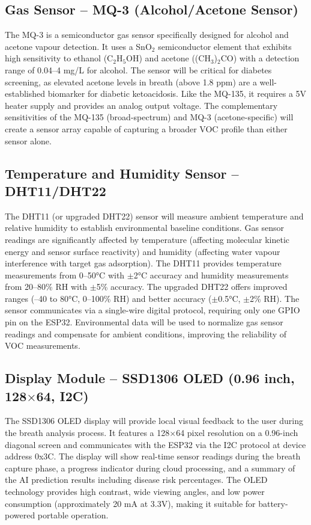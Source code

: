 \subsection{Gas Sensor -- MQ-3 (Alcohol/Acetone Sensor)}
The MQ-3 is a semiconductor gas sensor specifically designed for alcohol and acetone vapour detection. It uses a SnO$_2$ semiconductor element that exhibits high sensitivity to ethanol (C$_2$H$_5$OH) and acetone ((CH$_3$)$_2$CO) with a detection range of 0.04--4 mg/L for alcohol. The sensor will be critical for diabetes screening, as elevated acetone levels in breath (above 1.8 ppm) are a well-established biomarker for diabetic ketoacidosis. Like the MQ-135, it requires a 5V heater supply and provides an analog output voltage. The complementary sensitivities of the MQ-135 (broad-spectrum) and MQ-3 (acetone-specific) will create a sensor array capable of capturing a broader VOC profile than either sensor alone.

\subsection{Temperature and Humidity Sensor -- DHT11/DHT22}
The DHT11 (or upgraded DHT22) sensor will measure ambient temperature and relative humidity to establish environmental baseline conditions. Gas sensor readings are significantly affected by temperature (affecting molecular kinetic energy and sensor surface reactivity) and humidity (affecting water vapour interference with target gas adsorption). The DHT11 provides temperature measurements from 0--50°C with $\pm$2°C accuracy and humidity measurements from 20--80\% RH with $\pm$5\% accuracy. The upgraded DHT22 offers improved ranges (--40 to 80°C, 0--100\% RH) and better accuracy ($\pm$0.5°C, $\pm$2\% RH). The sensor communicates via a single-wire digital protocol, requiring only one GPIO pin on the ESP32. Environmental data will be used to normalize gas sensor readings and compensate for ambient conditions, improving the reliability of VOC measurements.

\subsection{Display Module -- SSD1306 OLED (0.96 inch, 128$\times$64, I2C)}
The SSD1306 OLED display will provide local visual feedback to the user during the breath analysis process. It features a 128$\times$64 pixel resolution on a 0.96-inch diagonal screen and communicates with the ESP32 via the I2C protocol at device address 0x3C. The display will show real-time sensor readings during the breath capture phase, a progress indicator during cloud processing, and a summary of the AI prediction results including disease risk percentages. The OLED technology provides high contrast, wide viewing angles, and low power consumption (approximately 20 mA at 3.3V), making it suitable for battery-powered portable operation.

